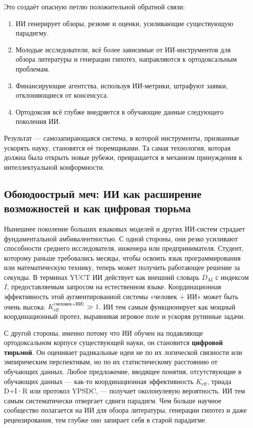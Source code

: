 \documentclass[12pt,a4paper]{article}
\begin{document}
	Это создаёт опасную петлю положительной обратной связи:
	\begin{enumerate}
		\item ИИ генерирует обзоры, резюме и оценки, усиливающие существующую парадигму.
		\item Молодые исследователи, всё более зависимые от ИИ‑инструментов для обзора литературы и генерации гипотез, направляются к ортодоксальным проблемам.
		\item Финансирующие агентства, используя ИИ‑метрики, штрафуют заявки, отклоняющиеся от консенсуса.
		\item Ортодоксия всё глубже внедряется в обучающие данные следующего поколения ИИ.
	\end{enumerate}
	Результат — самозапирающаяся система, в которой инструменты, призванные ускорять науку, становятся её тюремщиками. Та самая технология, которая должна была открыть новые рубежи, превращается в механизм принуждения к интеллектуальной конформности.
	
	\subsection{Обоюдоострый меч: ИИ как расширение возможностей и как цифровая тюрьма}
	
	Нынешнее поколение больших языковых моделей и других ИИ‑систем страдает фундаментальной амбивалентностью. С одной стороны, они резко усиливают способности среднего исследователя, инженера или предпринимателя. Студент, которому раньше требовались месяцы, чтобы освоить язык программирования или математическую технику, теперь может получить работающее решение за секунды. В терминах YUCT ИИ действует как внешний словарь \(D_{\text{AI}}\) с индексом \(I\), предоставляемым запросом на естественном языке. Координационная эффективность этой аугментированной системы «человек + ИИ» может быть очень высока: \(K_{\mathrm{eff}}^{\text{(человек+ИИ)}} \gg 1\). ИИ тем самым функционирует как мощный координационный протез, выравнивая игровое поле и ускоряя рутинные задачи.
	
	С другой стороны, именно потому что ИИ обучен на подавляюще ортодоксальном корпусе существующей науки, он становится \textbf{цифровой тюрьмой}. Он оценивает радикальные идеи не по их логической связности или эмпирическим перспективам, но по их статистическому расстоянию от обучающих данных. Любое предложение, вводящее понятия, отсутствующие в обучающих данных — как‑то координационная эффективность \(K_{\mathrm{eff}}\), триада D+I·R или протокол YPSDC, — получает околонулевую вероятность. ИИ тем самым систематически отвергает сдвиги парадигм. Чем больше научное сообщество полагается на ИИ для обзора литературы, генерации гипотез и даже рецензирования, тем глубже оно запирает себя в старой парадигме.
	
\end{document}
